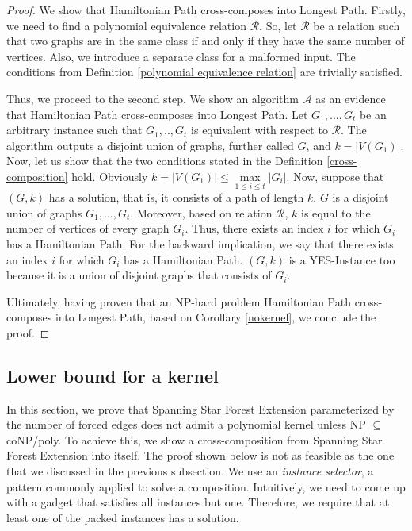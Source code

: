\documentclass[en]{pracamgr}
\newcommand{\ssfep}{{\sc Spanning Star Forest Extension}}
\begin{document}
\begin{proof}	
	 We show that {\sc Hamiltonian Path} cross-composes into {\sc Longest Path}. Firstly, we need to find a polynomial equivalence relation $\mathcal{R}$. So, let $\mathcal{R}$ be a relation such that two graphs are in the same class if and only if they have the same number of vertices. Also, we introduce a separate class for a malformed input. The conditions from Definition \ref{polynomial equivalence relation} are trivially satisfied. 
	
	Thus, we proceed to the second step. We show an algorithm $\mathcal{A}$ as an evidence that  {\sc Hamiltonian Path} cross-composes into {\sc Longest Path}. Let $G_1,...,G_t$ be an arbitrary instance such that $G_1,..,G_t$ is equivalent with respect to $\mathcal{R}$. The algorithm outputs a disjoint union of graphs, further called $G$, and $k=|V(G_1)|$. Now, let us show that the two conditions stated in the Definition \ref{cross-composition} hold. Obviously $k=|V(G_1)| \leq \max\limits_{1 \leq i \leq t} |G_i|$. Now, suppose that $(G,k)$ has a solution, that is, it consists of a path of length $k$. $G$ is a disjoint union of graphs $G_1,...,G_t$. Moreover, based on relation $\mathcal{R}$, $k$ is equal to the number of vertices of every graph $G_i$. Thus, there exists an index $i$ for which $G_i$ has a Hamiltonian Path. For the backward implication, we say that there exists an index $i$ for which $G_i$ has a Hamiltonian Path. $(G,k)$ is a YES-Instance too because it is a union of disjoint graphs that consists of $G_i$.
	
	Ultimately, having proven that an NP-hard problem {\sc Hamiltonian Path} cross-composes into {\sc Longest Path}, based on Corollary \ref{nokernel}, we conclude the proof.
\end{proof}

\subsection{Lower bound for a kernel}

In this section, we prove that \ssfep{} parameterized by the number of forced edges does not admit a polynomial kernel unless NP $\subseteq$ coNP/poly. To achieve this, we show a cross-composition from \ssfep{} into itself. The proof shown below is not as feasible as the one that we discussed in the previous subsection. We use an \emph{instance selector}, a pattern commonly applied to solve a composition. Intuitively, we need to come up with a gadget that satisfies all instances but one. Therefore, we require that at least one of the packed instances has a solution.
\end{document}
